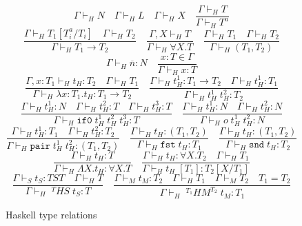 \begin{figure}
\[
\Gamma\vdash_{H}N
\quad
\Gamma\vdash_{H}L
\quad
\Gamma\vdash_{H}X
\quad
\frac{\Gamma\vdash_{H}T}{\Gamma\vdash_{H}T^{a}}
\]
\[
\frac{\Gamma\vdash_{H}T_{1}[T^{a}_{i}/T_{i}]\quad\Gamma\vdash_{H}T_{2}}{\Gamma\vdash_{H}T_{1}\rightarrow T_{2}}
\quad
\frac{\Gamma ,X\vdash_{H}T}{\Gamma\vdash_{H}\forall X.T}
\quad
\frac{\Gamma\vdash_{H}T_{1}\quad\Gamma\vdash_{H}T_{2}}{\Gamma\vdash_{H}(T_{1},T_{2})}
\]
\[
\Gamma\vdash_{H}\overline{n}:N
\quad
\frac{x:T\in\Gamma}{\Gamma\vdash_{H}x:T}
\]
\[
\frac{\Gamma,x:T_{1}\vdash_{H}t_{H}:T_{2}\quad\Gamma\vdash_{H}T_{1}}{\Gamma\vdash_{H}\lambda x:T_{1}.t_{H}:T_{1}\rightarrow T_{2}}
\quad
\frac{\Gamma\vdash_{H}t_{H}^{1}:T_{1}\rightarrow T_{2}\quad\Gamma\vdash_{H}t_{H}^{1}:T_{1}}{\Gamma\vdash_{H}t_{H}^{1}\;t_{H}^{2}:T_{2}}
\]
\[
\frac{\Gamma\vdash_{H}t_{H}^{1}:N\quad\Gamma\vdash_{H}t_{H}^{2}:T\quad\Gamma\vdash_{H}t_{H}^{3}:T}{\Gamma\vdash_{H}\mathtt{if0}\;t_{H}^{1}\;t_{H}^{2}\;t_{H}^{3}:T}
\quad
\frac{\Gamma\vdash_{H}t_{H}^{1}:N\quad\Gamma\vdash_{H}t_{H}^{2}:N}{\Gamma\vdash_{H}o\;t_{H}^{1}\;t_{H}^{2}:N}
\]
\[
\frac{\Gamma\vdash_{H}t_{H}^{1}:T_{1}\quad\Gamma\vdash_{H}t_{H}^{2}:T_{2}}{\Gamma\vdash_{H}\mathtt{pair}\;t_{H}^{1}\;t_{H}^{2}:(T_{1},T_{2})}
\quad
\frac{\Gamma\vdash_{H}t_{H}:(T_{1},T_{2})}{\Gamma\vdash_{H}\mathtt{fst}\;t_{H}:T_{1}}
\quad
\frac{\Gamma\vdash_{H}t_{H}:(T_{1},T_{2})}{\Gamma\vdash_{H}\mathtt{snd}\;t_{H}:T_{2}}
\]
\[
\frac{\Gamma\vdash_{H}t_{H}:T}{\Gamma\vdash_{H}\Lambda X.t_{H}:\forall X.T}
\quad
\frac{\Gamma\vdash_{H}t_{H}:\forall X.T_{2}\quad\Gamma\vdash_{H}T_{1}}{\Gamma\vdash_{H}t_{H}\;[T_{1}]:T_{2}[X/T_{1}]}
\]
\[
\frac{\Gamma\vdash_{S}t_{S}:TST\quad\Gamma\vdash_{H}T}{\Gamma\vdash_{H}\;^{T}HS\;t_{S}:T}
\quad
\frac{\Gamma\vdash_{M}t_{M}:T_{2}\quad\Gamma\vdash_{H}T_{1}\quad\Gamma\vdash_{M}T_{2}\quad T_{1}=T_{2}}{\Gamma\vdash_{H}\;^{T_{1}}HM^{T_{2}}\;t_{M}:T_{1}}
\]
\caption{Haskell type relations}
\label{htr}
\end{figure}